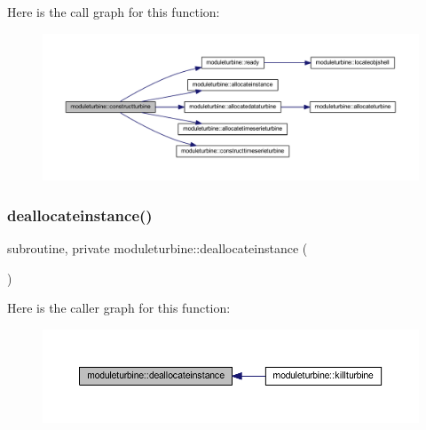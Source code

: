 Here is the call graph for this function\+:\nopagebreak
\begin{figure}[H]
\begin{center}
\leavevmode
\includegraphics[width=350pt]{namespacemoduleturbine_aa2c0679550365b9b4e3258a1d4a155cf_cgraph}
\end{center}
\end{figure}
\mbox{\label{namespacemoduleturbine_af2af37c97b47092470d2bf90bd9bc56e}} 
\subsubsection{\texorpdfstring{deallocateinstance()}{deallocateinstance()}}
{\footnotesize\ttfamily subroutine, private moduleturbine\+::deallocateinstance (\begin{DoxyParamCaption}{ }\end{DoxyParamCaption})\hspace{0.3cm}{\ttfamily [private]}}

Here is the caller graph for this function\+:\nopagebreak
\begin{figure}[H]
\begin{center}
\leavevmode
\includegraphics[width=350pt]{namespacemoduleturbine_af2af37c97b47092470d2bf90bd9bc56e_icgraph}
\end{center}
\end{figure}
\mbox{\label{namespacemoduleturbine_a9ba3c2694581c5c8d730d5cacd9c2a61}} 
